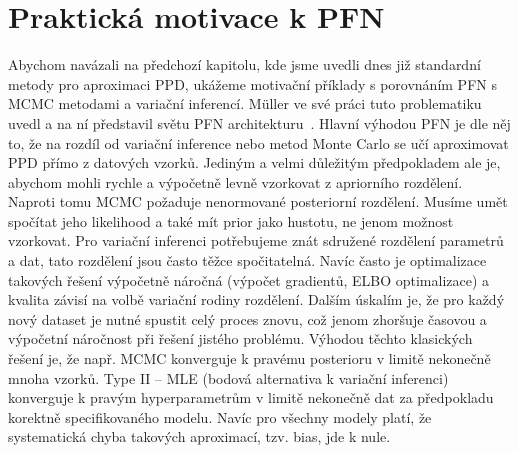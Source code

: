 \section{Praktická motivace k PFN}
\label{sec:pfn-motivace}
Abychom navázali na předchozí kapitolu, kde jsme uvedli dnes již standardní metody pro aproximaci PPD, ukážeme motivační příklady s porovnáním PFN s MCMC metodami a variační inferencí.
Müller ve své práci tuto problematiku uvedl a na ní představil světu PFN architekturu~\cite{muller2022}.
Hlavní výhodou PFN je dle něj to, že na rozdíl od variační inference nebo metod Monte Carlo se učí aproximovat PPD přímo z datových vzorků.
Jediným a velmi důležitým předpokladem ale je, abychom mohli rychle a výpočetně levně vzorkovat z apriorního rozdělení. 
Naproti tomu MCMC požaduje nenormované posteriorní rozdělení.
Musíme umět spočítat jeho likelihood a také mít prior jako hustotu, ne jenom možnost vzorkovat. 
Pro variační inferenci potřebujeme znát sdružené rozdělení parametrů a dat, tato rozdělení jsou často těžce spočitatelná.
Navíc často je optimalizace takových řešení výpočetně náročná (výpočet gradientů, ELBO optimalizace) a kvalita závisí na volbě variační rodiny rozdělení.
Dalším úskalím je, že pro každý nový dataset je nutné spustit celý proces znovu, což jenom zhoršuje časovou a výpočetní náročnost při řešení jistého problému.
Výhodou těchto klasických řešení je, že např. MCMC konverguje k pravému posterioru v limitě nekonečně mnoha vzorků.
Type II – MLE (bodová alternativa k variační inferenci) konverguje k pravým hyperparametrům v limitě nekonečně dat za předpokladu korektně specifikovaného modelu. 
Navíc pro všechny modely platí, že systematická chyba takových aproximací, tzv. bias, jde k nule.
\par   

